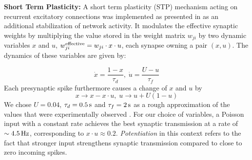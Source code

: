 \documentclass[10pt,letterpaper]{article}
\begin{document}
\textbf{Short Term Plasticity:} A short term plasticity (STP) mechanism acting on recurrent excitatory connections was implemented as presented in \cite{Markram_STP} as an additional stabilization of network activity. It modulates the effective synaptic weights by multiplying the value stored in the weight matrix $w_{ji}$ by two dynamic variables $x$ and $u$, $w^{\rm effective}_{ji} = w_{ji}\cdot x \cdot u$, each synapse owning a pair $(x,u)$. The dynamics of these variables are given by:

\begin{equation}
\dot{x} = \frac{1-x}{\tau_d},\; \dot{u} = \frac{U-u}{\tau_f}
\label{STP_dynamics1}
\end{equation}
Each presynaptic spike furthermore causes a change of $x$ and $u$ by
\begin{equation}
x \rightarrow x - x\cdot u,\; u \rightarrow u + U(1-u)
\label{STP_dynamics2}
\end{equation}
We chose $U=0.04$, $\tau_d =\rm 0.5\, s$ and $\tau_f =\rm 2\, s$ as a rough approximation of the values that were experimentally observed \cite{Markram_STP}. For our choice of variables, a Poisson input with a constant rate achieves the best synaptic transmission at a rate of $\sim \rm 4.5\, Hz$, corresponding to $x\cdot u \approx 0.2$. \textit{Potentiation} in this context refers to the fact that stronger input strengthens synaptic transmission compared to close to zero incoming spikes.
\end{document}
